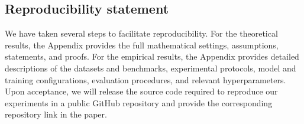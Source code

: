 \documentclass{article} %
\numberwithin{equation}{section}
\begin{document}
\subsection*{Reproducibility statement}
We have taken several steps to facilitate reproducibility. For the theoretical results, the Appendix provides the full mathematical settings, assumptions, statements, and proofs. For the empirical results, the Appendix provides detailed descriptions of the datasets and benchmarks, experimental protocols, model and training configurations, evaluation procedures, and relevant hyperparameters. Upon acceptance, we will release the source code required to reproduce our experiments in a public GitHub repository and provide the corresponding repository link in the paper.




\clearpage




\clearpage
\appendix


\end{document}

